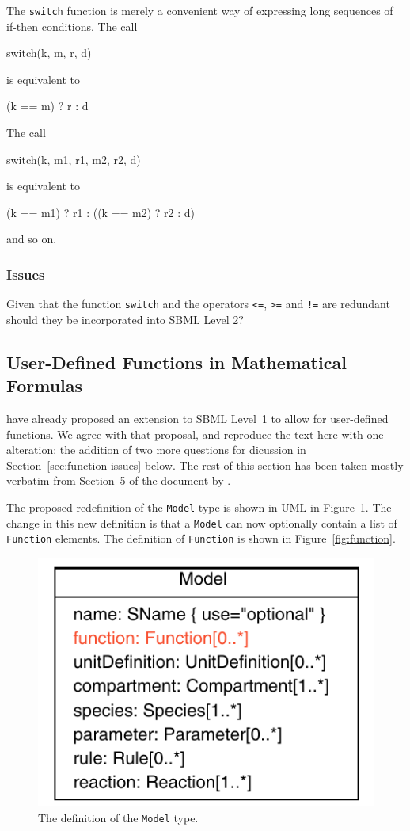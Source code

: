 \documentclass[10pt]{cekarticle}
\begin{document}
The \texttt{switch} function is merely a convenient way of expressing long
sequences of if-then conditions.  The call
\begin{example}
switch(k, m, r, d)
\end{example}
is equivalent to
\begin{example}
(k == m) ? r : d
\end{example}
The call
\begin{example}
switch(k, m1, r1, m2, r2, d)
\end{example}
is equivalent to
\begin{example}
(k == m1) ? r1 : ((k == m2) ? r2 : d)
\end{example}
and so on.

\subsubsection{Issues}

Given that the function \texttt{switch} and the operators
\texttt{<=}, \texttt{>=} and \texttt{!=} are redundant should
they be incorporated into SBML Level 2?


\newpage
\subsection{User-Defined Functions in Mathematical Formulas}
\label{sec:functions}

\citet{finney:2002c} have already proposed an extension to SBML Level~1 to
allow for user-defined functions.  We agree with that proposal, and
reproduce the text here with one alteration: the addition of two
more questions for dicussion in Section~\ref{sec:function-issues} below.  The
rest of this section has been taken mostly verbatim from Section~5 of the
document by \citet{finney:2002c}.

The proposed redefinition of the \texttt{Model} type is shown in UML in
Figure~\ref{fig:model}.  The change in this new definition is that a
\texttt{Model} can now optionally contain a list of \texttt{Function}
elements.  The definition of \texttt{Function} is shown in
Figure~\ref{fig:function}.

\begin{figure}[h]
  \vspace*{8pt}
  \centering
  \includegraphics[scale = 0.7]{model}
  \caption{The definition of the \texttt{Model} type.}
  \label{fig:model}
\end{figure}
\end{document}
